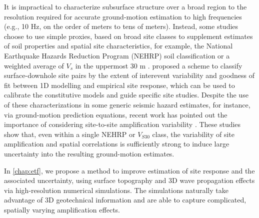 It is impractical to characterize subsurface structure over a broad region to the resolution required for accurate ground-motion estimation to high frequencies (e.g., 10 Hz, on the order of meters to tens of meters). Instead, some studies choose to use simple proxies, based on broad site classes to supplement estimates of soil properties and spatial site characteristics, for example, the National Earthquake Hazards Reduction Program (NEHRP) soil classification \citep{bssc2003NEHRPRecommended2003,akkarEmpiricalEquationsPrediction2010} or a weighted average of $V_s$ in the uppermost 30 m \citep[$V_{S30}$, e.g., ][]{abrahamsonSummaryAbrahamsonSilva2008,idrissNGAWest2EmpiricalModel2014}. \citet{thompsonTaxonomySiteResponse2012} proposed a scheme to classify surface-downhole site pairs by the extent of interevent variability and goodness of fit between 1D modelling and empirical site response, which can be used to calibrate the constitutive models and guide specific site studies. Despite the use of these characterizations in some generic seismic hazard estimates, for instance, via ground-motion prediction equations, recent work has pointed out the importance of considering site-to-site amplification variability \citep{atkinsonEarthquakeGroundmotionPrediction2006,atikVariabilityGroundmotionPrediction2010}. These studies show that, even within a single NEHRP or $V_{S30}$ class, the variability of site amplification and spatial correlations is sufficiently strong to induce large uncertainty into the resulting ground-motion estimates.

In \cref{chap:etf}, we propose a method to improve estimation of site response and the associated uncertainty, using surface topography and 3D wave propagation effects via high-resolution numerical simulations. The simulations naturally take advantage of 3D geotechnical information and are able to capture complicated, spatially varying amplification effects.


\renewcommand{\thetable}{\arabic{table}}
\renewcommand{\thefigure}{\arabic{figure}}



